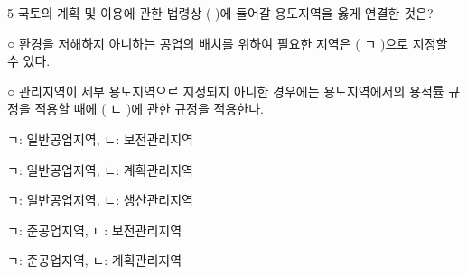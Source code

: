 \begin{question}{5}
국토의 계획 및 이용에 관한 법령상 ( )에 들어갈 용도지역을 옳게 연결한 것은?
\begin{framedtext}
○ 환경을 저해하지 아니하는 공업의 배치를 위하여 필요한 지역은 ( ㄱ )으로 지정할 수 있다. \par
○ 관리지역이 세부 용도지역으로 지정되지 아니한 경우에는 용도지역에서의 용적률 규정을 적용할 때에 ( ㄴ )에 관한 규정을 적용한다. \par
\end{framedtext}
\begin{choices}
  \item ㄱ: 일반공업지역, ㄴ: 보전관리지역
  \item ㄱ: 일반공업지역, ㄴ: 계획관리지역
  \item ㄱ: 일반공업지역, ㄴ: 생산관리지역
  \item ㄱ: 준공업지역, ㄴ: 보전관리지역
  \item ㄱ: 준공업지역, ㄴ: 계획관리지역
\end{choices}
\end{question}
